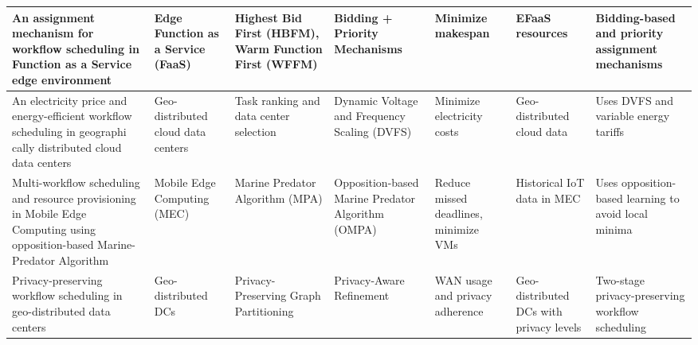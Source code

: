 \documentclass[a4paper, final]{article}
\begin{document}
\begin{table}[H]
\begin{tabularx}{\textwidth}{|p{3.5cm}|X|X|p{2cm}|X|X|X|}
    An assignment mechanism for workflow scheduling in Function as a Service edge environment \cite{bib:4_faas} &
    Edge Function as a Service (FaaS) &
    Highest Bid First (HBFM), Warm Function First (WFFM) &
    Bidding + Priority Mechanisms &
    Minimize makespan &
    EFaaS resources &
    Bidding-based and priority assignment mechanisms \\
    \hline

    An electricity price and energy-efficient workflow scheduling in geographi
    cally distributed cloud data centers \cite{bib:5_epee} &
    Geo-distributed cloud data centers &
    Task ranking and data center selection &
    Dynamic Voltage and Frequency Scaling (DVFS) &
    Minimize electricity costs &
    Geo-distributed cloud data &
    Uses DVFS and variable energy tariffs \\
    \hline

    Multi-workflow scheduling and resource provisioning in Mobile Edge Computing using opposition-based Marine-Predator Algorithm \cite{bib:6_marine} &
    Mobile Edge Computing (MEC) &
    Marine Predator Algorithm (MPA) &
    Opposition-based Marine Predator Algorithm (OMPA) &
    Reduce missed deadlines, minimize VMs &
    Historical IoT data in MEC &
    Uses opposition-based learning to avoid local minima \\
    \hline

    Privacy-preserving workflow scheduling in geo-distributed data centers \cite{bib:7_ppps} &
    Geo-distributed DCs &
    Privacy-Preserving Graph Partitioning &
    Privacy-Aware Refinement &
    WAN usage and privacy adherence &
    Geo-distributed DCs with privacy levels &
    Two-stage privacy-preserving workflow scheduling \\
    \hline


\end{tabularx}
\end{table}
\end{document}
